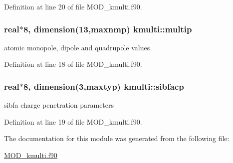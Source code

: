 Definition at line 20 of file M\-O\-D\-\_\-kmulti.\-f90.

\hypertarget{classkmulti_adcec17ef84782e479d984ba5f8c77c0b}{
\subsubsection[{multip}]{\setlength{\rightskip}{0pt plus 5cm}real$\ast$8, dimension(13,{\bf maxnmp}) kmulti\-::multip}}\label{classkmulti_adcec17ef84782e479d984ba5f8c77c0b}


atomic monopole, dipole and quadrupole values 



Definition at line 18 of file M\-O\-D\-\_\-kmulti.\-f90.

\hypertarget{classkmulti_a2844e444f59fa942d7f54b2c0d70813c}{
\subsubsection[{sibfacp}]{\setlength{\rightskip}{0pt plus 5cm}real$\ast$8, dimension(3,maxtyp) kmulti\-::sibfacp}}\label{classkmulti_a2844e444f59fa942d7f54b2c0d70813c}


sibfa charge penetration parameters 



Definition at line 19 of file M\-O\-D\-\_\-kmulti.\-f90.



The documentation for this module was generated from the following file\-:\begin{DoxyCompactItemize}
\item 
\hyperlink{MOD__kmulti_8f90}{M\-O\-D\-\_\-kmulti.\-f90}\end{DoxyCompactItemize}

